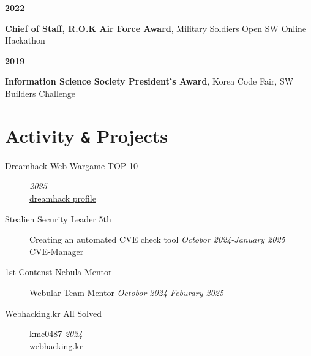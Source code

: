 \documentclass[margin,line]{resume}
\begin{document}
\begin{resume}
        \textbf{2022}
        \vspace{1mm}
        \begin{list2}
          \item \textbf{Chief of Staff, R.O.K Air Force Award}, Military Soldiers Open SW Online Hackathon
        \end{list2}
        
        \textbf{2019}
        \vspace{1mm}
        \begin{list2}
          \item \textbf{Information Science Society President's Award}, Korea Code Fair, SW Builders Challenge \\
        \end{list2}

    

 	    \section{\mysidestyle Activity \texttt{\&} Projects}\vspace{2mm}   	   
 	   
 	          
            \begin{description}   
                \item[Dreamhack Web Wargame TOP 10] \hfill \textsl{2025}\\
    				\href{https://dreamhack.io/users/17504}{dreamhack profile}
  			\vspace{2mm}

                \item[Stealien Security Leader 5th]\small{Creating an automated CVE check tool \hfill \textsl{Octobor 2024-January 2025}}\\
 				    \faGithub\space\href{https://github.com/minchan02/CVE-Manager}{CVE-Manager}
 			\vspace{2mm}
  	      		        
   		    \item[1st Contenst Nebula Mentor]\small{Webular Team Mentor \hfill \textsl{Octobor 2024-Feburary 2025}}\\ 	
 	      	\vspace{2mm}
   
    		\item[Webhacking.kr All Solved]\small{kmc0487 \hfill \textsl{2024}}\\
  	      		\href{https://webhacking.kr}{webhacking.kr}
 			\vspace{2mm}


\end{description}
\end{resume}
\end{document}
